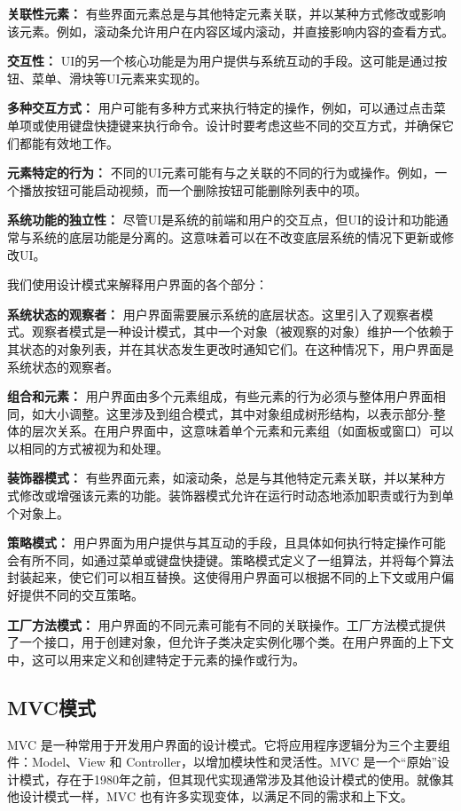 \textbf{关联性元素：}
有些界面元素总是与其他特定元素关联，并以某种方式修改或影响该元素。例如，滚动条允许用户在内容区域内滚动，并直接影响内容的查看方式。

\textbf{交互性：}
UI的另一个核心功能是为用户提供与系统互动的手段。这可能是通过按钮、菜单、滑块等UI元素来实现的。

\textbf{多种交互方式：}
用户可能有多种方式来执行特定的操作，例如，可以通过点击菜单项或使用键盘快捷键来执行命令。设计时要考虑这些不同的交互方式，并确保它们都能有效地工作。

\textbf{元素特定的行为：}
不同的UI元素可能有与之关联的不同的行为或操作。例如，一个播放按钮可能启动视频，而一个删除按钮可能删除列表中的项。

\textbf{系统功能的独立性：}
尽管UI是系统的前端和用户的交互点，但UI的设计和功能通常与系统的底层功能是分离的。这意味着可以在不改变底层系统的情况下更新或修改UI。

我们使用设计模式来解释用户界面的各个部分：

\textbf{系统状态的观察者：}
用户界面需要展示系统的底层状态。这里引入了观察者模式。观察者模式是一种设计模式，其中一个对象（被观察的对象）维护一个依赖于其状态的对象列表，并在其状态发生更改时通知它们。在这种情况下，用户界面是系统状态的观察者。

\textbf{组合和元素：}
用户界面由多个元素组成，有些元素的行为必须与整体用户界面相同，如大小调整。这里涉及到组合模式，其中对象组成树形结构，以表示部分-整体的层次关系。在用户界面中，这意味着单个元素和元素组（如面板或窗口）可以以相同的方式被视为和处理。

\textbf{装饰器模式：}
有些界面元素，如滚动条，总是与其他特定元素关联，并以某种方式修改或增强该元素的功能。装饰器模式允许在运行时动态地添加职责或行为到单个对象上。

\textbf{策略模式：}
用户界面为用户提供与其互动的手段，且具体如何执行特定操作可能会有所不同，如通过菜单或键盘快捷键。策略模式定义了一组算法，并将每个算法封装起来，使它们可以相互替换。这使得用户界面可以根据不同的上下文或用户偏好提供不同的交互策略。

\textbf{工厂方法模式：}
用户界面的不同元素可能有不同的关联操作。工厂方法模式提供了一个接口，用于创建对象，但允许子类决定实例化哪个类。在用户界面的上下文中，这可以用来定义和创建特定于元素的操作或行为。

\subsection{MVC模式}

MVC 是一种常用于开发用户界面的设计模式。它将应用程序逻辑分为三个主要组件：Model、View 和 Controller，以增加模块性和灵活性。MVC 是一个“原始”设计模式，存在于1980年之前，但其现代实现通常涉及其他设计模式的使用。就像其他设计模式一样，MVC 也有许多实现变体，以满足不同的需求和上下文。

